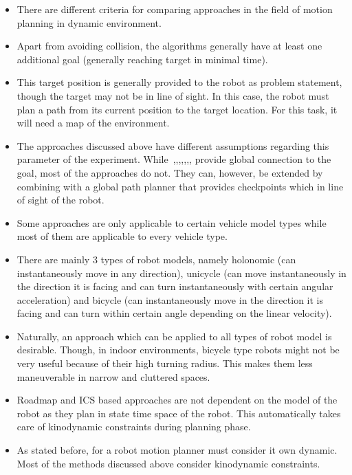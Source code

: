 \begin{itemize}
    \item There are different criteria for comparing approaches in the field of motion planning  in dynamic environment.
    \item Apart from avoiding collision, the algorithms generally have at least one additional goal (generally reaching target in minimal time).
    \item This target position is generally provided to the robot as problem statement, though the target may not be in line of sight. In this case, the robot must plan a path from its current position to the target location. For this task, it will need a map of the environment. 
    \item The approaches discussed above have different assumptions regarding this parameter of the experiment. While~\cite{brock1999high},\cite{ogren2005convergent},\cite{seder2007dynamic},\cite{chung2009safe},\cite{petti2005safe},\cite{hsu2002randomized},\cite{van2006anytime},\cite{ge2002dynamic} provide global connection to the goal, most of the approaches do not. They can, however, be extended by combining with a global path planner that provides checkpoints which in line of sight of the robot.
    \item Some approaches are only applicable to certain vehicle model types while most of them are applicable to every vehicle type.
    \item There are mainly 3 types of robot models, namely holonomic (can instantaneously move in any direction), unicycle (can move instantaneously in the direction it is facing and can turn instantaneously with certain angular acceleration) and bicycle (can instantaneously move in the direction it is facing and can turn within certain angle depending on the linear velocity)\cite{hoy2015algorithms}.
    \item Naturally, an approach which can be applied to all types of robot model is desirable. Though, in indoor environments, bicycle type robots might not be very useful because of their high turning radius. This makes them less maneuverable in narrow and cluttered spaces.
    \item Roadmap and ICS based approaches are not dependent on the model of the robot as they plan in state time space of the robot. This automatically takes care of kinodynamic constraints during planning phase.
    \item As stated before, for a robot motion planner must consider it own dynamic\cite{fraichard2007short}. Most of the methods discussed above consider kinodynamic constraints.

\end{itemize}
